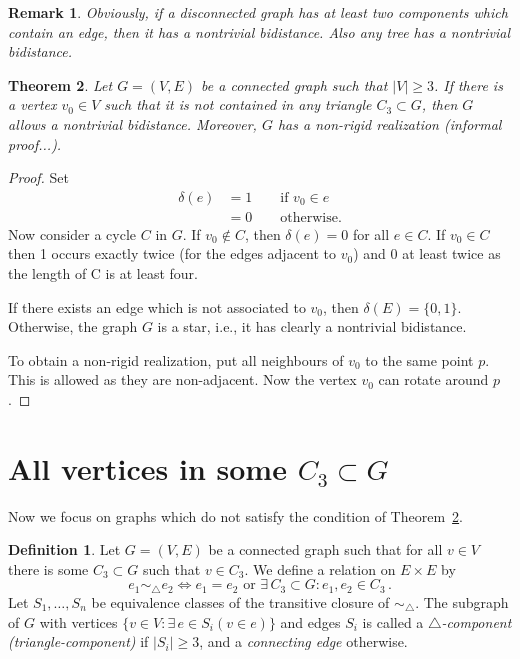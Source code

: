 \documentclass[a4paper, 11pt]{article}
\newcommand{\trcomp}{$\triangle$-component}
\newtheorem{thm}{Theorem}[section]
\newtheorem{rem}[thm]{Remark}
\theoremstyle{definition}
\newtheorem{defn}{Definition}[section]
\begin{document}
\begin{rem}
Obviously, if a disconnected graph has at least two components which contain an edge, then it has a nontrivial bidistance. Also any tree has a nontrivial bidistance.
\end{rem}

\begin{thm}
\label{thm:vertexNotInTriangle}
Let $G=(V,E)$ be a connected graph such that $|V|\geq 3$. If there is a vertex $v_0 \in V$ such that it is not contained in any triangle $C_3\subset G$, then $G$ allows a nontrivial bidistance. Moreover, $G$ has a non-rigid realization (informal proof...).
\end{thm}
\begin{proof}
Set
\begin{align*}
\delta(e)&=1 \qquad \text{if } v_0 \in e \\
		&=0 \qquad \text{otherwise.}
\end{align*} 
Now consider a cycle $C$ in $G$. If $v_0\notin C$, then $\delta(e)=0$ for all $e\in C$. If $v_0\in C$ then  1 occurs exactly twice (for the edges adjacent to $v_0$) and 0 at least twice as the length of C is at least four.

If there exists an edge which is not associated to $v_0$, then $\delta(E)=\{0,1\}$. Otherwise, the graph $G$ is a star, i.e., it has clearly a nontrivial bidistance.

To obtain a non-rigid realization, put all neighbours of $v_0$ to the same point $p$. This is allowed as they are non-adjacent. Now the vertex $v_0$ can rotate around $p$.
\end{proof}

\section{All vertices in some $C_3\subset G$}
Now we focus on graphs which do not satisfy the condition of Theorem~\ref{thm:vertexNotInTriangle}.
 

\begin{defn}
Let $G=(V,E)$ be a connected graph such that for all $v\in V$ there is some $C_3\subset G$ such that $v\in C_3$. We define a relation on $E\times E$ by 
$$e_1 \sim_{\!\!\bigtriangleup} e_2 \iff e_1=e_2 \text{ or } \exists\, C_3\subset G: e_1, e_2\in C_3\,.$$
Let $S_1, \dots, S_n$ be equivalence classes of the transitive closure of $\sim_{\!\!\bigtriangleup}$. The subgraph of $G$ with vertices $\{v\in V \colon \exists\, e\in S_i (v\in e)\}$ and edges $S_i$ is called a \emph{\trcomp{} (triangle-component)} if $|S_i|\geq 3$, and a \emph{connecting edge} otherwise.
\end{defn}
\end{document}
